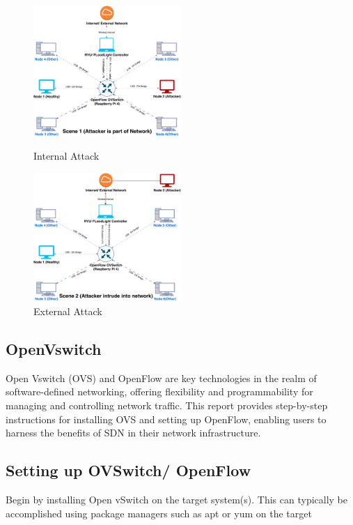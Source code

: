\documentclass[12pt,twocolumn]{article}
\begin{document}
\begin{figure}[ht]
    \includegraphics[width=0.5\textwidth]{images/Scene1.pdf}
    \caption{Internal Attack}
    \label{fig:Scene1}
\vspace*{0.5 cm}
    \includegraphics[width=0.5\textwidth]{images/Scene2.pdf}
    \caption{External Attack}
    \label{fig:scene2}
\end{figure}

\subsection{OpenVswitch}

 Open Vswitch (OVS) and OpenFlow are key technologies in the realm of software-defined networking, offering flexibility and programmability for managing and controlling network traffic. This report provides step-by-step instructions for installing OVS and setting up OpenFlow, enabling users to harness the benefits of SDN in their network infrastructure.

\subsection{Setting up OVSwitch/ OpenFlow}

Begin by installing Open vSwitch on the target system(s). This can typically be accomplished using package managers such as apt or yum on the target 
\end{document}
